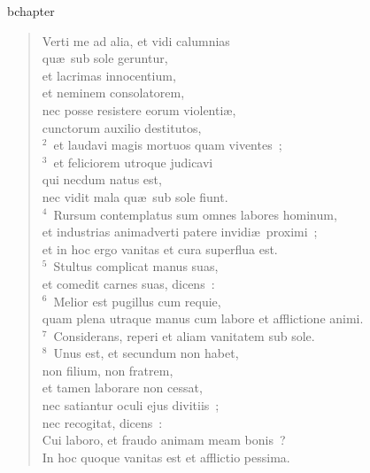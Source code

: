bchapter\begin{verse}\vspace{-19pt}Verti me ad alia, et vidi calumnias\\ qu\ae\ sub sole geruntur,\\ et lacrimas innocentium,\\ et neminem consolatorem,\\ nec posse resistere eorum violenti\ae ,\\ cunctorum auxilio destitutos,\\
${}^{2}$~et laudavi magis mortuos quam viventes~;\\
${}^{3}$~et feliciorem utroque judicavi\\ qui necdum natus est,\\ nec vidit mala qu\ae\ sub sole fiunt.\\
${}^{4}$~Rursum contemplatus sum omnes labores hominum,\\ et industrias animadverti patere invidi\ae\ proximi~;\\ et in hoc ergo vanitas et cura superflua est.\\
${}^{5}$~Stultus complicat manus suas,\\ et comedit carnes suas, dicens~:\\
${}^{6}$~Melior est pugillus cum requie,\\ quam plena utraque manus cum labore et afflictione animi.\\
${}^{7}$~Considerans, reperi et aliam vanitatem sub sole.\\
${}^{8}$~Unus est, et secundum non habet,\\ non filium, non fratrem,\\ et tamen laborare non cessat,\\ nec satiantur oculi ejus divitiis~;\\ nec recogitat, dicens~:\\ Cui laboro, et fraudo animam meam bonis~?\\ In hoc quoque vanitas est et afflictio pessima.\end{verse}


